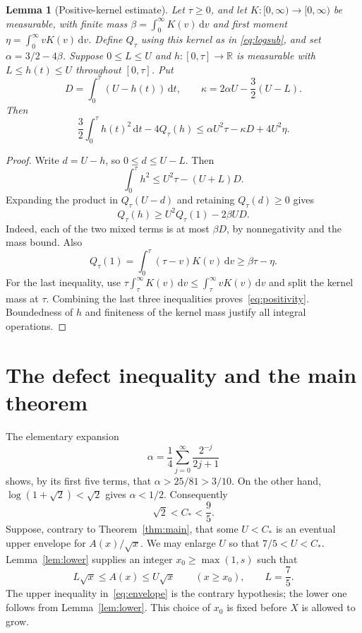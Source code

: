 \documentclass[11pt]{article}
\newtheorem{lemma}[theorem]{Lemma}
\theoremstyle{definition}\newtheorem{definition}[theorem]{Definition}
\theoremstyle{remark}\newtheorem{remark}[theorem]{Remark}
\numberwithin{equation}{section}
\newcommand{\al}{\alpha}
\newcommand{\Cs}{C_*}
\newcommand{\dd}{\,\mathrm d}
\begin{document}
\begin{lemma}[Positive-kernel estimate]\label{lem:positivity}
Let $\tau\ge0$, and let $K:[0,\infty)\to[0,\infty)$ be measurable, with
finite mass $\beta=\int_0^\infty K(v)\dd v$ and first moment
$\eta=\int_0^\infty vK(v)\dd v$. Define $Q_\tau$ using this kernel as in
\eqref{eq:logsub}, and set $\al=3/2-4\beta$. Suppose $0\le L\le U$ and
$h:[0,\tau]\to\mathbb R$ is measurable with $L\le h(t)\le U$ throughout
$[0,\tau]$. Put
\[
D=\int_0^\tau(U-h(t))\dd t,
\qquad \kappa=2\al U-\frac32(U-L).
\]
Then
\begin{equation}\label{eq:positivity}
\frac32\int_0^\tau h(t)^2\dd t-4Q_\tau(h)
\le\al U^2\tau-\kappa D+4U^2\eta.
\end{equation}
\end{lemma}
\begin{proof}
Write $d=U-h$, so $0\le d\le U-L$. Then
\[
\int_0^\tau h^2\le U^2\tau-(U+L)D.
\]
Expanding the product in $Q_\tau(U-d)$ and retaining $Q_\tau(d)\ge0$ gives
\[
Q_\tau(h)\ge U^2Q_\tau(1)-2\beta UD.
\]
Indeed, each of the two mixed terms is at most $\beta D$, by nonnegativity and the mass bound. Also
\[
Q_\tau(1)=\int_0^\tau(\tau-v)K(v)\dd v\ge\beta\tau-\eta.
\]
For the last inequality, use
$\tau\int_\tau^\infty K(v)\dd v\le\int_\tau^\infty vK(v)\dd v$
and split the kernel mass at $\tau$.
Combining the last three inequalities proves~\eqref{eq:positivity}. Boundedness of $h$ and finiteness of the kernel mass justify all integral operations.
\end{proof}

\section{The defect inequality and the main theorem}
The elementary expansion
\[
\al=\frac14\sum_{j=0}^\infty\frac{2^{-j}}{2j+1}
\]
shows, by its first five terms, that $\al>25/81>3/10$. On the other hand, $\log(1+\sqrt2)<\sqrt2$ gives $\al<1/2$. Consequently
\begin{equation}\label{eq:bounds}
\sqrt2<\Cs<\frac95.
\end{equation}
Suppose, contrary to Theorem~\ref{thm:main}, that some $U<\Cs$ is an eventual upper envelope for $A(x)/\sqrt x$. We may enlarge $U$ so that $7/5<U<\Cs$. Lemma~\ref{lem:lower} supplies an integer $x_0\ge\max(1,s)$ such that
\begin{equation}\label{eq:envelope}
L\sqrt x\le A(x)\le U\sqrt x\qquad(x\ge x_0),\qquad L=\frac75.
\end{equation}
The upper inequality in~\eqref{eq:envelope} is the contrary hypothesis; the lower one follows from Lemma~\ref{lem:lower}. This choice of $x_0$ is fixed before $X$ is allowed to grow.
\end{document}
